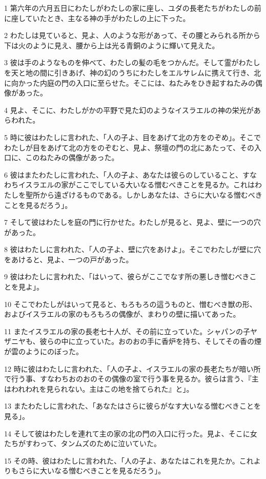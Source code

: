 \par 1 第六年の六月五日にわたしがわたしの家に座し、ユダの長老たちがわたしの前に座していたとき、主なる神の手がわたしの上に下った。
\par 2 わたしは見ていると、見よ、人のような形があって、その腰とみられる所から下は火のように見え、腰から上は光る青銅のように輝いて見えた。
\par 3 彼は手のようなものを伸べて、わたしの髪の毛をつかんだ。そして霊がわたしを天と地の間に引きあげ、神の幻のうちにわたしをエルサレムに携えて行き、北に向かった内庭の門の入口に至らせた。そこには、ねたみをひき起すねたみの偶像があった。
\par 4 見よ、そこに、わたしがかの平野で見た幻のようなイスラエルの神の栄光があらわれた。
\par 5 時に彼はわたしに言われた、「人の子よ、目をあげて北の方をのぞめ」。そこでわたしが目をあげて北の方をのぞむと、見よ、祭壇の門の北にあたって、その入口に、このねたみの偶像があった。
\par 6 彼はまたわたしに言われた、「人の子よ、あなたは彼らのしていること、すなわちイスラエルの家がここでしている大いなる憎むべきことを見るか。これはわたしを聖所から遠ざけるものである。しかしあなたは、さらに大いなる憎むべきことを見るだろう」。
\par 7 そして彼はわたしを庭の門に行かせた。わたしが見ると、見よ、壁に一つの穴があった。
\par 8 彼はわたしに言われた、「人の子よ、壁に穴をあけよ」。そこでわたしが壁に穴をあけると、見よ、一つの戸があった。
\par 9 彼はわたしに言われた、「はいって、彼らがここでなす所の悪しき憎むべきことを見よ」。
\par 10 そこでわたしがはいって見ると、もろもろの這うものと、憎むべき獣の形、およびイスラエルの家のもろもろの偶像が、まわりの壁に描いてあった。
\par 11 またイスラエルの家の長老七十人が、その前に立っていた。シャパンの子ヤザニヤも、彼らの中に立っていた。おのおの手に香炉を持ち、そしてその香の煙が雲のようにのぼった。
\par 12 時に彼はわたしに言われた、「人の子よ、イスラエルの家の長老たちが暗い所で行う事、すなわちおのおのその偶像の室で行う事を見るか。彼らは言う、『主はわれわれを見られない。主はこの地を捨てられた』と」。
\par 13 またわたしに言われた、「あなたはさらに彼らがなす大いなる憎むべきことを見る」。
\par 14 そして彼はわたしを連れて主の家の北の門の入口に行った。見よ、そこに女たちがすわって、タンムズのために泣いていた。
\par 15 その時、彼はわたしに言われた、「人の子よ、あなたはこれを見たか。これよりもさらに大いなる憎むべきことを見るだろう」。
